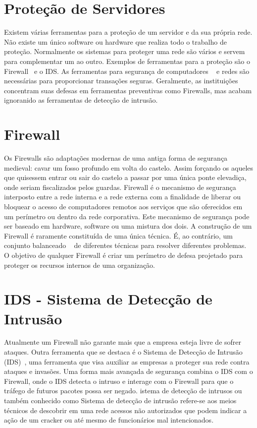 \section{Proteção de Servidores}
Existem várias ferramentas para a proteção de um servidor e da sua própria rede. Não existe um único software ou hardware que realiza todo o trabalho de proteção. Normalmente os sistemas para proteger uma rede são vários e servem para complementar um ao outro. Exemplos de ferramentas para a proteção são o Firewall~\cite{raitz} e o IDS.
As ferramentas para segurança de computadores ~\cite{morimoto} e redes são necessárias para proporcionar transações seguras. Geralmente, as instituições concentram suas defesas em ferramentas preventivas como Firewalls, mas acabam ignoranido as ferramentas de detecção de intrusão.

\section{Firewall} 
Os Firewalls são adaptações modernas de uma antiga forma de segurança medieval: cavar um fosso profundo em volta do castelo. Assim forçando os aqueles que quisessem entrar ou sair do castelo  a passar por uma única ponte elevadiça, onde seriam fiscalizados pelos guardas.
Firewall é o mecanismo de segurança interposto entre a rede interna e a rede externa com a finalidade de liberar ou bloquear o acesso de computadores remotos aos serviços que são oferecidos em um perímetro ou dentro da rede corporativa. Este mecanismo de segurança pode ser baseado em hardware, software ou uma mistura dos dois.
A construção de um Firewall é raramente constituída de uma única técnica. É, ao contrário, um conjunto balanceado ~\cite{tanenbaum} de diferentes técnicas para resolver diferentes problemas. O objetivo de qualquer Firewall é criar um perímetro de defesa projetado para proteger os recursos internos de uma organização.

\section{IDS - Sistema de Detecção de Intrusão}
Atualmente um Firewall não garante mais que a empresa esteja livre de sofrer ataques. Outra ferramenta que se destaca é o Sistema de Detecção de Intrusão (IDS)~\cite{laureano}, uma ferramenta que visa auxiliar as empresas a proteger sua rede contra ataques e invasões.
Uma forma mais avançada de segurança combina o IDS com o Firewall, onde o IDS detecta
o intruso e interage com o Firewall para que o tráfego de futuros pacotes possa ser negado.
istema de detecção de intrusos ou também conhecido como Sistema de detecção de intrusão refere-se aos meios técnicos de descobrir em uma rede acessos não autorizados que podem indicar a ação de um cracker ou até mesmo de funcionários mal intencionados.

